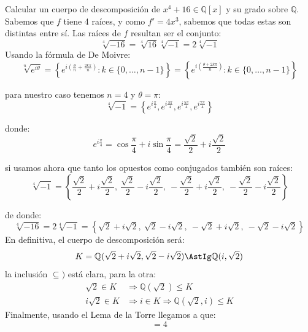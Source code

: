 \begin{ejercicio}
    Calcular un cuerpo de descomposición de $x^4+16\in \mathbb{Q}[x]$ y su grado sobre $\mathbb{Q}$.\\

    \noindent
    Sabemos que $f$ tiene 4 raíces, y como $f'=4x^3$, sabemos que todas estas son distintas entre sí. Las raíces de $f$ resultan ser el conjunto:
    \begin{equation*}
        \sqrt[4]{-16} = \sqrt[4]{16}\sqrt[4]{-1} = 2\sqrt[4]{-1}
    \end{equation*}
    Usando la fórmula de De Moivre:
    \begin{equation*}
        \sqrt[n]{e^{i\theta}} = \left\{e^{i\left(\frac{\theta}{n}+\frac{2k\pi}{n}\right)}: k \in \{0,\ldots,n-1\}\right\} = \left\{e^{i\left(\frac{\theta+2k\pi}{n}\right)}:k \in \{0,\ldots,n-1\}\right\}
    \end{equation*}

    para nuestro caso tenemos $n=4$ y $\theta = \pi$:
    \begin{equation*}
        \sqrt[4]{-1} = \left\{e^{i\frac{\pi}{4}}, e^{i\frac{3\pi}{4}}, e^{i\frac{5\pi}{4}}, e^{i\frac{7\pi}{4}}\right\}
    \end{equation*}

    donde:
    \begin{equation*}
        e^{i\frac{\pi}{4}} = \cos\frac{\pi}{4} + i\sin\frac{\pi}{4} = \frac{\sqrt{2}}{2} + i\frac{\sqrt{2}}{2}
    \end{equation*}

    si usamos ahora que tanto los opuestos como conjugados también son raíces:
    \begin{equation*}
        \sqrt[4]{-1} = \left\{\frac{\sqrt{2}}{2} + i\frac{\sqrt{2}}{2},~\frac{\sqrt{2}}{2} - i\frac{\sqrt{2}}{2},~-\frac{\sqrt{2}}{2} + i\frac{\sqrt{2}}{2},~-\frac{\sqrt{2}}{2} - i\frac{\sqrt{2}}{2}\right\}
    \end{equation*}

    de donde:
    \begin{equation*}
        \sqrt[4]{-16} = 2\sqrt[4]{-1} = \left\{\sqrt{2} + i\sqrt{2},~\sqrt{2} - i\sqrt{2},~-\sqrt{2} + i\sqrt{2},~-\sqrt{2} - i\sqrt{2}\right\}
    \end{equation*}
    En definitiva, el cuerpo de descomposición será:
    \begin{equation*}
        K = \mathbb{Q}(\sqrt{2}+i\sqrt{2}, \sqrt{2}-i\sqrt{2}) \AstIg \mathbb{Q}(i,\sqrt{2})
    \end{equation*}
    la inclusión $\subseteq )$ está clara, para la otra:
    \begin{align*}
        \sqrt{2}\in K &\Longrightarrow \mathbb{Q}(\sqrt{2}) \leq K \\
        i\sqrt{2}\in K &\Longrightarrow i \in K \Longrightarrow \mathbb{Q}(\sqrt{2},i) \leq K
    \end{align*}
    Finalmente, usando el Lema de la Torre llegamos a que:
    \begin{equation*}
        [K:\mathbb{Q}] = 4
    \end{equation*}
\end{ejercicio}

